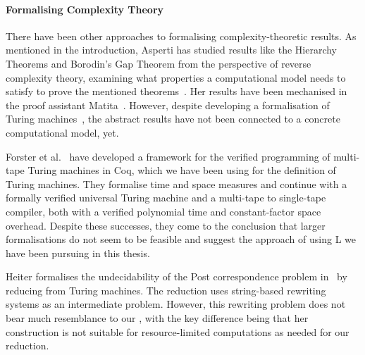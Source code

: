 \paragraph{Formalising Complexity Theory}
There have been other approaches to formalising complexity-theoretic results. As mentioned in the introduction, Asperti has studied results like the Hierarchy Theorems and Borodin's Gap Theorem from the perspective of reverse complexity theory, examining what properties a computational model needs to satisfy to prove the mentioned theorems~\cite{asperti:reverse_complexity, asperti:borodin}. Her results have been mechanised in the proof assistant Matita~\cite{matita_web}. However, despite developing a formalisation of Turing machines~\cite{asperti_ricciotti}, the abstract results have not been connected to a concrete computational model, yet.

Forster et al.~\cite{ForsterEtAl:2019:VerifiedTMs} have developed a framework for the verified programming of multi-tape Turing machines in Coq, which we have been using for the definition of Turing machines. They formalise time and space measures and continue with a formally verified universal Turing machine and a multi-tape to single-tape compiler, both with a verified polynomial time and constant-factor space overhead. Despite these successes, they come to the conclusion that larger formalisations do not seem to be feasible and suggest the approach of using L we have been pursuing in this thesis.

Heiter formalises the undecidability of the Post correspondence problem in~\cite{heiter:pcp} by reducing from Turing machines. The reduction uses string-based rewriting systems as an intermediate problem. However, this rewriting problem does not bear much resemblance to our \PR{}, with the key difference being that her construction is not suitable for resource-limited computations as needed for our reduction.

